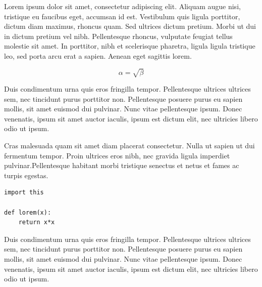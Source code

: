 Lorem ipsum dolor sit amet, consectetur adipiscing elit. Aliquam augue nisi,
tristique eu faucibus eget, accumsan id est. Vestibulum quis ligula porttitor,
dictum diam maximus, rhoncus quam. Sed ultrices dictum pretium. Morbi ut dui in
dictum pretium vel nibh. Pellentesque rhoncus, vulputate
feugiat tellus molestie sit amet. In porttitor, nibh et scelerisque pharetra,
ligula ligula tristique leo, sed porta arcu erat a sapien. Aenean eget sagittis
lorem.

\begin{equation}
    \label{simple_equation}
    \alpha = \sqrt{ \beta }
\end{equation}

Duis condimentum urna quis eros fringilla tempor. Pellentesque ultrices
ultrices sem, nec tincidunt purus porttitor non. Pellentesque posuere purus
eu sapien mollis, sit amet euismod dui pulvinar. Nunc vitae pellentesque
ipsum. Donec venenatis, ipsum sit amet auctor iaculis, ipsum est dictum
elit, nec ultricies libero odio ut ipsum.

Cras malesuada quam sit amet diam placerat consectetur. Nulla ut sapien ut dui
fermentum tempor. Proin ultrices eros nibh, nec gravida ligula imperdiet
pulvinar.Pellentesque habitant morbi tristique senectus et netus et fames ac
turpis egestas.

\begin{verbatim}
import this

def lorem(x):
    return x*x
\end{verbatim}

Duis condimentum urna quis eros fringilla tempor. Pellentesque ultrices
ultrices sem, nec tincidunt purus porttitor non. Pellentesque posuere purus
eu sapien mollis, sit amet euismod dui pulvinar. Nunc vitae pellentesque
ipsum. Donec venenatis, ipsum sit amet auctor iaculis, ipsum est dictum
elit, nec ultricies libero odio ut ipsum.
